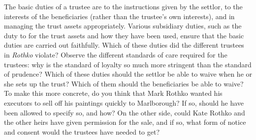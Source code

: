 \item The basic duties of a trustee are  to the instructions
given by the settlor,  to the interests of the beneficiaries
(rather than the trustee's own interests), and  in managing the
trust assets appropriately. Various subsidiary duties, such as the duty to
for the trust assets and how they have been used, ensure that
the basic duties are carried out faithfully. Which of these duties did the
different trustees in \textit{Rothko} violate? Observe the different standards
of care required for the trustees: why is the standard of loyalty so much more
stringent than the standard of prudence? Which of these duties should the
settlor be able to waive when he or she sets up the trust? Which of them should
the beneficiaries be able to waive? To make this more concrete, do you think
that Mark Rothko wanted his executors to sell off his paintings quickly to
Marlborough? If so, should he have been allowed to specify so, and how? On the
other side, could Kate Rothko and the other heirs have given permission for the
sale, and if so, what form of notice and consent would the trustees have needed
to get?

